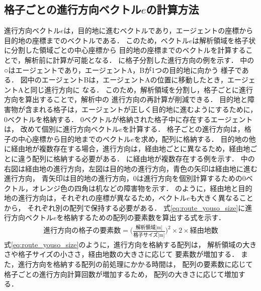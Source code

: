 \subsection{格子ごとの進行方向ベクトル$e$の計算方法}
進行方向ベクトル$e$は，目的地に進むベクトルであり，エージェントの座標から
目的地の座標までのベクトルである．
このため，ベクトル$e$は解析領域を格子状に分割した領域ごとの中心座標から
目的地の座標までのベクトルを計算することで，解析前に計算が可能となる．
に格子分割した進行方向の例を示す．
%
%
中の○はエージェントであり，エージェントA，Bが1つの目的地に向かう
様子である．
図中のエージェントBは，エージェントAの位置に移動したとき，エージェントAと同じ進行方向に
なる．
このため，解析領域を分割し，格子ごとに進行方向を算出することで，解析中の
進行方向の再計算が削減できる．
目的地と障害物が含まれる格子は，エージェントが正しく目的地に進むようにするために，
0ベクトルを格納する．
0ベクトルが格納された格子中に存在するエージェントは，
改めて個別に進行方向ベクトル$e$を計算する．
格子ごとの進行方向は，格子の中心座標から目的地までのベクトル$e$を求め，配列に格納する．
目的地の他に経由地が複数存在する場合，進行方向は，経由地ごとに異なるため，経由地ごとに違う配列に格納する必要がある．
に経由地が複数存在する例を示す．
中の右図は経由地の進行方向，左図は目的地の進行方向，青色の矢印は経由地に進む進行方向，
青矢印は目的地の進行方向，0は進行方向を個別計算するための0ベクトル，オレンジ色の四角は机などの障害物を示す．
のように，経由地と目的地の進行方向は，それぞれの座標が異なるため，ベクトル$e$も大きく異なることから，
それぞれ別の配列で保持する必要がある．
式\eqref{eq:route_youso_size}に進行方向ベクトル$e$を格納するための配列の要素数を算出する式を示す．
%
\begin{eqnarray}
 \mbox{進行方向の格子の要素数} = 
 \big( \frac{\mbox{解析領域[m]}}{\mbox{格子サイズ[m]}} \big) ^ 2 \times  2 \times \mbox{経由地数}
 \label{eq:route_youso_size}
\end{eqnarray}
%
式\eqref{eq:route_youso_size}のように，進行方向を格納する配列は，
解析領域の大きさや格子サイズの小ささ，経由地数の大きさに応じて
要素数が増加する．
また，進行方向を格納する配列の前処理にかかる時間は，
配列の要素数に応じて格子ごとの進行方向計算回数が増加するため，
配列の大きさに応じて増加する．

